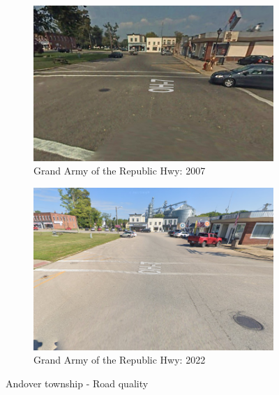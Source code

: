 \begin{figure}[htbp]
    \centering
    \begin{minipage}[b]{0.49\textwidth}
        \centering
        \begin{subfigure}[b]{\textwidth}
            \centering
            \includegraphics[width=\textwidth,keepaspectratio]{images/andover_township_14grandarmy_2007.png}
            \caption{Grand Army of the Republic Hwy: 2007
            \label{fig:andover_2007}}
        \end{subfigure}
    \end{minipage}
    \hfill
    \begin{minipage}[b]{0.49\textwidth}
        \centering
        \begin{subfigure}[b]{\textwidth}
            \centering
            \includegraphics[width=\textwidth,keepaspectratio]{images/andover_township_14grandarmy_2022.png}
            \caption{Grand Army of the Republic Hwy: 2022}
            \label{fig:andover_2022}
        \end{subfigure}
    \end{minipage}

    \vspace{1em}

    \caption{Andover township - Road quality}
    \label{fig:rd_andover}
\end{figure}

